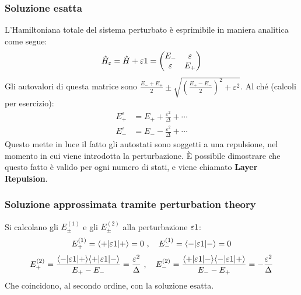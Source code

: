 \subsubsection*{Soluzione esatta}
L'Hamiltoniana totale del sistema perturbato è esprimibile in maniera analitica come segue:
\[
	\hat{H}_\varepsilon = \hat{H} + \varepsilon 1 = \begin{pmatrix}
	E_- & \varepsilon \\
	\varepsilon & E_+
	\end{pmatrix}
\]
Gli autovalori di questa matrice sono $\frac{E_-+E_+}{2} \pm \sqrt{\left(\frac{E_+-E_-}{2}\right)^2 + \varepsilon^2}$. Al ché (calcoli per esercizio):
\begin{align*}
E_+^\varepsilon &= E_+ + \frac{\varepsilon^2}{\Delta} + \cdots \\
E_-^\varepsilon &= E_- - \frac{\varepsilon^2}{\Delta} + \cdots
\end{align*}
Questo mette in luce il fatto gli autostati sono soggetti a una repulsione, nel momento in cui viene introdotta la perturbazione. È possibile dimostrare che questo fatto è valido per ogni numero di stati, e viene chiamato \textbf{Layer Repulsion}.

\subsubsection*{Soluzione approssimata tramite perturbation theory}
Si calcolano gli $E_\pm^{(1)}$ e gli $E_\pm^{(2)}$ alla perturbazione $\varepsilon 1$:
\[
E_+^{(1)} = \langle + | \varepsilon 1 | + \rangle = 0 \ ,\quad E_-^{(1)} = \langle - | \varepsilon 1 | - \rangle = 0
\]
\[
E_+^{(2)} = \frac{\langle - | \varepsilon 1 | + \rangle \langle + | \varepsilon 1 | - \rangle}{E_+ - E_-} = \frac{\varepsilon^2}{\Delta} \ ,\quad E_-^{(2)} = \frac{\langle + | \varepsilon 1 | - \rangle \langle - | \varepsilon 1 | + \rangle}{E_- - E_+} = -\frac{\varepsilon^2}{\Delta}
\]
Che coincidono, al secondo ordine, con la soluzione esatta.